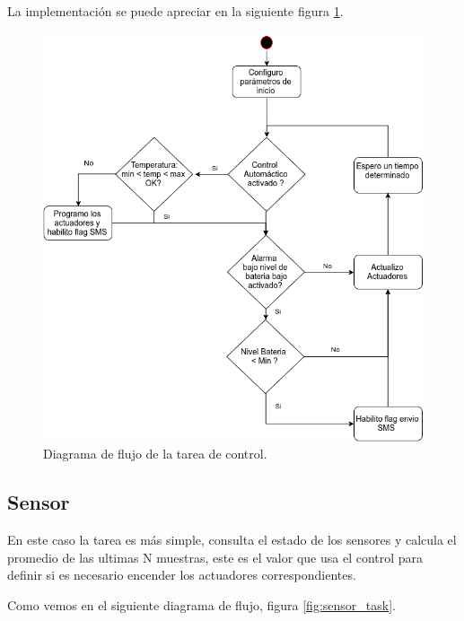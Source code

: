 La implementación se puede apreciar en la siguiente figura \ref{fig:control_task}.

\begin{figure}[!htb]
  \centering
  \includegraphics[scale=.5]{./Figures/control_task.png}
  \caption{Diagrama de flujo de la tarea de control.}
  \label{fig:control_task}
\end{figure}


\subsection*{Sensor}
 En este caso la tarea es más simple, consulta el estado de los sensores y calcula el promedio de las ultimas N muestras, este es el valor que usa el control para definir si es necesario encender los actuadores correspondientes.

 Como vemos en el siguiente diagrama de flujo, figura \ref{fig:sensor_task}.

